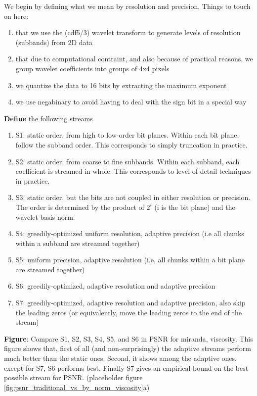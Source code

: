 We begin by defining what we mean by resolution and precision. Things to touch on here:

\begin{enumerate}
  \item that we use the (cdf5/3) wavelet transform to generate levels of resolution (subbands) from 2D data
  \item that due to computational contraint, and also because of practical reasons, we group wavelet coefficients into groups of 4x4 pixels
  \item we quantize the data to 16 bits by extracting the maximum exponent
  \item we use negabinary to avoid having to deal with the sign bit in a special way
\end{enumerate}

\textbf{Define} the following streams
\begin{enumerate}
  \item S1: static order, from high to low-order bit planes. Within each bit plane, follow the subband order. This corresponds to simply truncation in practice.
  \item S2: static order, from coarse to fine subbands. Within each subband, each coefficient is streamed in whole. This corresponds to level-of-detail techniques in practice.
  \item S3: static order, but the bits are not coupled in either resolution or precision. The order is determined by the product of $2^i$ (i is the bit plane) and the wavelet basis norm.
  \item S4: greedily-optimized uniform resolution, adaptive precision (i.e all chunks within a subband are streamed together)
  \item S5: uniform precision, adaptive resolution (i.e, all chunks within a bit plane are streamed together)
  \item S6: greedily-optimized, adaptive resolution and adaptive precision 
  \item S7: greedily-optimized, adaptive resolution and adaptive precision, also skip the leading zeros (or equivalently, move the leading zeros to the end of the stream)
\end{enumerate}

\textbf{Figure}: Compare S1, S2, S3, S4, S5, and S6 in PSNR for miranda, viscosity. This figure shows that, first of all (and non-surprisingly) the adaptive streams perform much better than the static ones. Second, it shows among the adaptive ones, except for S7, S6 performs best. Finally S7 gives an empirical bound on the best possible stream for PSNR. (placeholder figure \ref{fig:psnr_traditional_vs_by_norm_viscosity}a)

